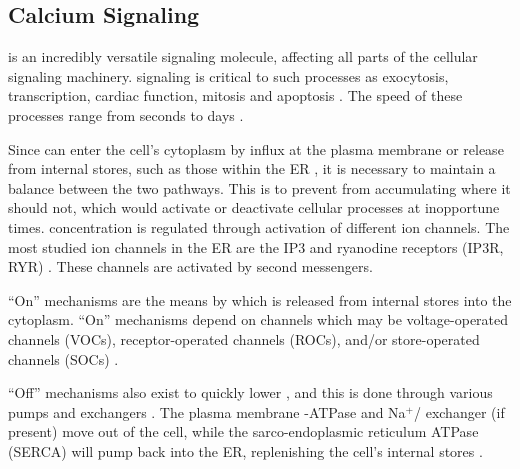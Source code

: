 \subsection{Calcium Signaling}
\Ca{} is an incredibly versatile signaling molecule, affecting all parts of the cellular signaling machinery. \Ca{} signaling is critical to such processes as exocytosis, transcription, cardiac function, mitosis and apoptosis \citep{Berridge2003,Berridge2000,Gwack2007,Smyth2010}. 
The speed of these processes range from seconds to days \citep{Berridge2003}. 

Since \Ca{} can enter the cell's cytoplasm by influx at the plasma membrane or release from internal stores, such as those within the ER \citep{Berridge2003,Berridge2000,Smyth2010}, it is necessary to maintain a balance between the two pathways. This is to prevent \Ca{} from accumulating where it should not, which would activate or deactivate cellular processes at inopportune times. 
\Ca{} concentration is regulated through activation of different  ion channels.
The most studied \Ca{} ion channels in the ER are the IP3 and ryanodine receptors  (IP3R, RYR) \citep{Berridge2000, Lewis2001, WPutney:2006p130}. These channels are activated by %
second messengers. %

``On'' mechanisms are the means by which \Ca{} is released from internal stores into the cytoplasm. ``On'' mechanisms depend on \Ca{} channels \citep{Berridge2000} which may be voltage-operated channels (VOCs), receptor-operated channels (ROCs), and/or store-operated channels (SOCs) \citep{Berridge2000}. 


``Off'' mechanisms also exist to quickly lower \cai, and this is done through various pumps and exchangers \citep{Berridge2000}. The plasma membrane \Ca -ATPase and Na$^+$/\Ca{} exchanger (if present)  move \Ca{} out of the cell, while the sarco-endoplasmic reticulum \Ca{} ATPase (SERCA) will pump \Ca{} back into the ER, replenishing the cell's internal stores \citep{Berridge2000}.

